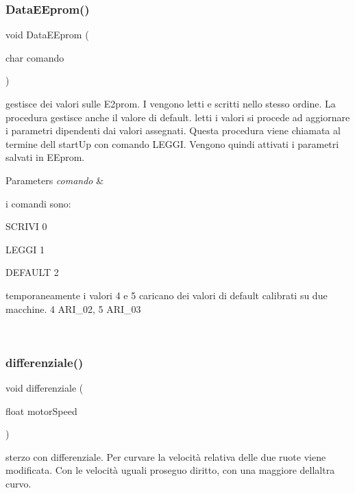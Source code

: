 \subsubsection{\texorpdfstring{Data\+E\+Eprom()}{DataEEprom()}}
{\footnotesize\ttfamily void Data\+E\+Eprom (\begin{DoxyParamCaption}\item[{char}]{comando }\end{DoxyParamCaption})}



gestisce dei valori sulle E2prom. I vengono letti e scritti nello stesso ordine. La procedura gestisce anche il valore di default. letti i valori si procede ad aggiornare i parametri dipendenti dai valori assegnati. Questa procedura viene chiamata al termine dell\textquotesingle{} start\+Up con comando L\+E\+G\+GI. Vengono quindi attivati i parametri salvati in E\+Eprom. 


\begin{DoxyParams}{Parameters}
{\em comando} & \begin{DoxyVerb}i comandi sono:

SCRIVI  0

LEGGI   1

DEFAULT 2

temporaneamente i valori 4 e 5 caricano dei valori di default calibrati su due macchine. 4 ARI_02, 5 ARI_03\end{DoxyVerb}
 \\
\hline
\end{DoxyParams}
\mbox{\label{ari_pi__2_d_c__esp__08_8ino_af117273d2066fa1917036ae9a9742ae7}} 
\subsubsection{\texorpdfstring{differenziale()}{differenziale()}}
{\footnotesize\ttfamily void differenziale (\begin{DoxyParamCaption}\item[{float}]{motor\+Speed }\end{DoxyParamCaption})}



sterzo con differenziale. Per curvare la velocità relativa delle due ruote viene modificata. Con le velocità uguali proseguo diritto, con una maggiore dell\textquotesingle{}altra curvo. 

